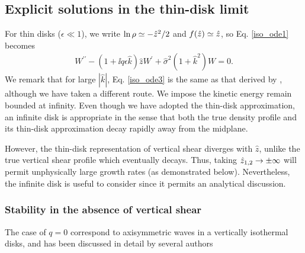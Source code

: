 \subsection{Explicit solutions in the thin-disk limit}
For thin disks ($\epsilon\ll1$), we write 
$\ln\rho\simeq -\hat{z}^2/2$ and $f(\hat{z})\simeq \hat{z}$, 
so Eq. \ref{iso_ode1} becomes  
\begin{align}\label{iso_ode3}
  W^{\prime\prime} - \left(1 + \ii q\epsilon
    \hat{k}\right)\hat{z}W^\prime  +
  \hat{\sigma}^2\left(1+\hat{k}^2\right)W = 
  0.
\end{align}
We remark that for large $|\hat{k}|$, Eq. \ref{iso_ode3} is the same as
that derived by \cite{nelson13}, although we have taken a different
route.  
We impose the kinetic energy remain bounded at infinity. Even though
we have adopted the thin-disk approximation, an infinite
disk is appropriate in the sense that both the true density profile 
and its thin-disk approximation decay rapidly away from the midplane.   

However, the thin-disk representation of vertical shear diverges with 
$\hat{z}$, unlike the true vertical shear profile which eventually
decays. Thus, taking $\hat{z}_{1,2}\to \pm\infty$ will permit 
unphysically large growth rates (as demonstrated below). Nevertheless,
the infinite disk is useful to consider since it permits an analytical
discussion.   

\subsubsection{Stability in the absence of vertical shear}\label{iso_stable}
The case of $q=0$ correspond to axisymmetric waves in a vertically isothermal disks, and has been discussed in detail 
by several authors \citep[e.g.][]{}





